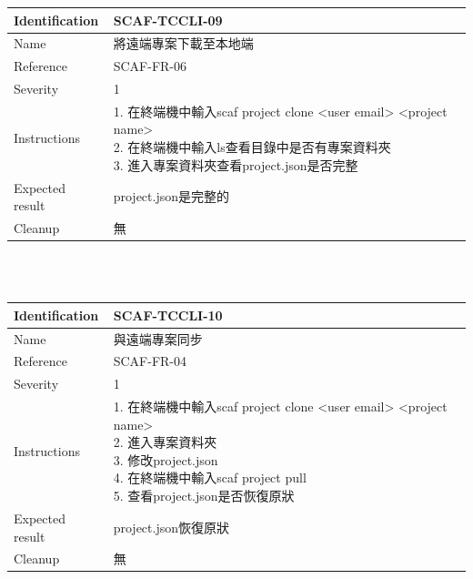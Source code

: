 \documentclass{report}
\begin{document}
\begin{tabularx}{\textwidth}{
  |p{}%
  |p{}|%
  }
  \hline
  \centering Identification &  SCAF-TCCLI-09 \\
  \hline
  \centering Name & 將遠端專案下載至本地端 \\
  \hline
  \centering Reference & SCAF-FR-06 \\
  \hline
  \centering Severity & 1 \\
  \hline
  \centering Instructions & 
  \makecell[l]{
    1. 在終端機中輸入scaf project clone <user email> <project name>\\
    2. 在終端機中輸入ls查看目錄中是否有專案資料夾 \\
    3. 進入專案資料夾查看project.json是否完整
  }\\
  \hline
  \centering Expected result & project.json是完整的 \\
  \hline
  \centering Cleanup & 無 \\
  \hline
\end{tabularx}
\\
\newline
\\

\begin{tabularx}{\textwidth}{
  |p{}%
  |p{}|%
  }
  \hline
  \centering Identification &  SCAF-TCCLI-10 \\
  \hline
  \centering Name & 與遠端專案同步 \\
  \hline
  \centering Reference & SCAF-FR-04 \\
  \hline
  \centering Severity & 1 \\
  \hline
  \centering Instructions & 
  \makecell[l]{
    1. 在終端機中輸入scaf project clone <user email> <project name>\\
    2. 進入專案資料夾 \\
    3. 修改project.json \\
    4. 在終端機中輸入scaf project pull \\
    5. 查看project.json是否恢復原狀 \\
  }\\
  \hline
  \centering Expected result & project.json恢復原狀 \\
  \hline
  \centering Cleanup & 無 \\
  \hline
\end{tabularx}
\\
\newline
\\
\end{document}
